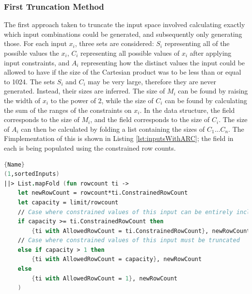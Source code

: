 \subsubsection{First Truncation Method}
The first approach taken to truncate the input space involved calculating exactly which input combinations could be generated, and subsequently only generating those. For each input $x_i$, three sets are considered: $S_i$ representing all of the possible values the $x_i$, $C_i$ representing all possible values of $x_i$ after applying input constraints, and $A_i$ representing how the distinct values the input could be allowed to have if the size of the Cartesian product was to be less than or equal to 1024. The sets $S_i$ and $C_i$ may be very large, therefore they are never generated. Instead, their sizes are inferred. The size of $M_i$ can be found by raising the width of $x_i$ to the power of 2, while the size of $C_i$ can be found by calculating the sum of the ranges of the constraints on $x_i$. In the  data structure, the  field corresponds to the size of $M_i$, and the  field corresponds to the size of $C_i$.
The size of $A_i$ can then be calculated by folding a list containing the sizes of $C_1...C_n$. The F\fsharp implementation of this is shown in Listing \ref{lst:inputsWithARC}; the  field in each  is being populated using the constrained row counts.
\begin{lstlisting}[caption=Calculating Allowed Row Counts,frame=tlrb, language=FSharp, label=lst:inputsWithARC]{Name}
(1,sortedInputs)
||> List.mapFold (fun rowcount ti ->
    let newRowCount = rowcount*ti.ConstrainedRowCount
    let capacity = limit/rowcount
    // Case where constrained values of this input can be entirely included
    if capacity >= ti.ConstrainedRowCount then
        {ti with AllowedRowCount = ti.ConstrainedRowCount}, newRowCount
    // Case where constrained values of this input must be truncated
    else if capacity > 1 then
        {ti with AllowedRowCount = capacity}, newRowCount
    else
        {ti with AllowedRowCount = 1}, newRowCount
    )

\end{lstlisting}

